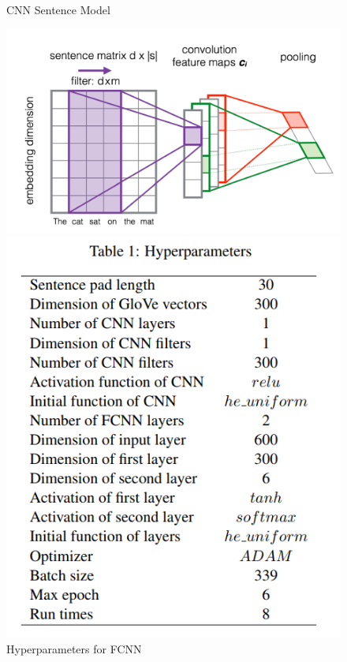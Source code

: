 \documentclass[12pt]{report} %
\begin{document}
	\begin{figure}[!tbp]
		\centering
		\begin{minipage}[b]{0.43\textwidth}
		\centering
		\label{CNN_1}
		\caption{CNN Sentence Model \cite{severyn2015learning}}
		\includegraphics[scale=0.20]{image/CNN_sentModel.png}
		\end{minipage}
		\hfill
		\begin{minipage}[b]{0.3\textwidth}
		\centering
		\caption{Hyperparameters for FCNN \cite{shao2017hcti}}
		\label{params}
		
		\includegraphics[scale=0.35]{image/hyperparameters.png}
		
		\end{minipage}
	\end{figure}
	
\end{document}
